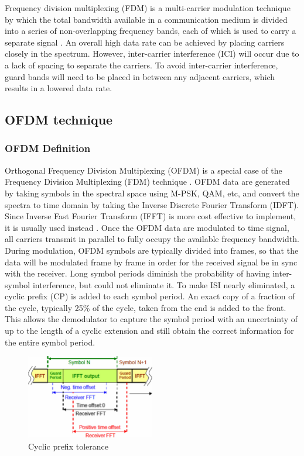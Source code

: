 Frequency division multiplexing (FDM) is a multi-carrier modulation technique by which the total bandwidth available in a communication medium is divided into a series of non-overlapping frequency bands, each of which is used to carry a separate signal \cite{b2}.
An overall high data rate can be achieved by placing carriers closely in the spectrum. However, inter-carrier interference (ICI) will occur due to a lack of spacing to separate the carriers. To avoid inter-carrier interference, guard bands will need to be placed in between any adjacent carriers, which results in a lowered data rate.

\subsection{OFDM technique}

\subsubsection{OFDM Definition}

Orthogonal Frequency Division Multiplexing (OFDM) is a special case of the Frequency Division Multiplexing (FDM) technique \cite{OFDM2010}.
OFDM data are generated by taking symbols in the spectral space using M-PSK, QAM, etc, and convert the spectra to time domain by taking the Inverse Discrete Fourier Transform (IDFT). Since Inverse Fast Fourier Transform (IFFT) is more cost effective to implement, it is usually used instead \cite{b3}. Once the OFDM data are modulated to time signal, all carriers transmit in parallel to fully occupy the available frequency bandwidth. During modulation, OFDM symbols are typically divided into frames, so that the data will be modulated frame by frame in order for the received signal be in sync with the receiver. Long symbol periods diminish the probability of having inter-symbol interference, but could not eliminate it. To make ISI nearly eliminated, a cyclic prefix (CP) is added to each symbol period. An exact copy of a fraction of the cycle, typically 25\% of the cycle, taken from the end is added to the front. This allows the demodulator to capture the symbol period with an uncertainty of up to the length of a cyclic extension and still obtain the correct information for the entire symbol period.

\begin{figure}[ht]
    \centering
    \includegraphics[width=0.5\textwidth]{Figures/Cyclic-extension-tolerance}
    \caption{Cyclic prefix tolerance}
    \label{Cyclic-extension-tolerance}
\end{figure}

